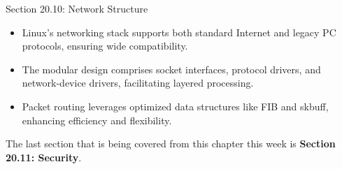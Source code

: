 \begin{notes}{Section 20.10: Network Structure}
    \begin{highlight}
        \begin{itemize}
            \item Linux's networking stack supports both standard Internet and legacy PC protocols, ensuring wide compatibility.
            \item The modular design comprises socket interfaces, protocol drivers, and network-device drivers, facilitating layered processing.
            \item Packet routing leverages optimized data structures like FIB and skbuff, enhancing efficiency and flexibility.
        \end{itemize}
    \end{highlight}
\end{notes}

The last section that is being covered from this chapter this week is \textbf{Section 20.11: Security}.

